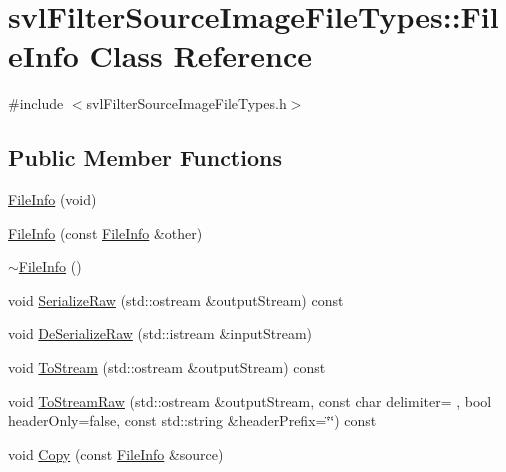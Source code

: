 \hypertarget{classsvl_filter_source_image_file_types_1_1_file_info}{}\section{svl\+Filter\+Source\+Image\+File\+Types\+:\+:File\+Info Class Reference}
\label{classsvl_filter_source_image_file_types_1_1_file_info}


{\ttfamily \#include $<$svl\+Filter\+Source\+Image\+File\+Types.\+h$>$}

\subsection*{Public Member Functions}
\begin{DoxyCompactItemize}
\item 
\hyperlink{classsvl_filter_source_image_file_types_1_1_file_info_a336686357196062683dd68ab639876db}{File\+Info} (void)
\item 
\hyperlink{classsvl_filter_source_image_file_types_1_1_file_info_a66aa1d8089aa327dab3965355f1aa9f0}{File\+Info} (const \hyperlink{classsvl_filter_source_image_file_types_1_1_file_info}{File\+Info} \&other)
\item 
\hyperlink{classsvl_filter_source_image_file_types_1_1_file_info_a13dc99ad9ee9125900c948b5bfa6f11d}{$\sim$\+File\+Info} ()
\item 
void \hyperlink{classsvl_filter_source_image_file_types_1_1_file_info_ab03f91c5f4b127ad8de7a2c8c0fc784c}{Serialize\+Raw} (std\+::ostream \&output\+Stream) const 
\item 
void \hyperlink{classsvl_filter_source_image_file_types_1_1_file_info_a089776ea7f9c7caa168082b0ef4b9eb7}{De\+Serialize\+Raw} (std\+::istream \&input\+Stream)
\item 
void \hyperlink{classsvl_filter_source_image_file_types_1_1_file_info_a9c8f20c39693da32b003a5b732d81819}{To\+Stream} (std\+::ostream \&output\+Stream) const 
\item 
void \hyperlink{classsvl_filter_source_image_file_types_1_1_file_info_a89a0e6461a33f3eb9c07af622037d518}{To\+Stream\+Raw} (std\+::ostream \&output\+Stream, const char delimiter= \textquotesingle{} \textquotesingle{}, bool header\+Only=false, const std\+::string \&header\+Prefix=\char`\"{}\char`\"{}) const 
\item 
void \hyperlink{classsvl_filter_source_image_file_types_1_1_file_info_a09dcc6ec7afb086957a6370ee80b4fb3}{Copy} (const \hyperlink{classsvl_filter_source_image_file_types_1_1_file_info}{File\+Info} \&source)

\end{DoxyCompactItemize}

